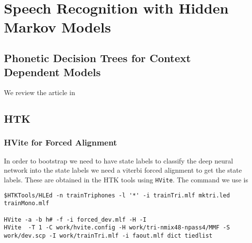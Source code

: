 \chapter{Speech Recognition with Hidden Markov Models}

\section{Phonetic Decision Trees for Context Dependent Models}
We review the article in \cite{young1994state}


\section{HTK}

\subsection{HVite for Forced Alignment}

In order to bootstrap we need to have state labels to classify the deep
neural network into the state labels we need a viterbi forced alignment
to get the state labels.  These are obtained in the HTK tools using
\texttt{HVite}.  The command we use is
\begin{verbatim}
$HTKTools/HLEd -n trainTriphones -l '*' -i trainTri.mlf mktri.led trainMono.mlf

HVite -a -b h# -f -i forced_dev.mlf -H -I
HVite  -T 1 -C work/hvite.config -H work/tri-nmix48-npass4/MMF -S work/dev.scp -I work/trainTri.mlf -i faout.mlf dict tiedlist 
\end{verbatim}
